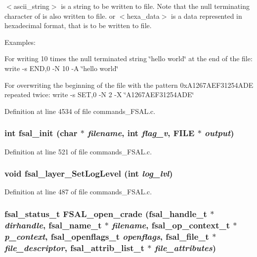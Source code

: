 $<$ascii\_\-string$>$ is a string to be written to file. Note that the null terminating character of is also written to file. or $<$hexa\_\-data$>$ is a data represented in hexadecimal format, that is to be written to file.

Examples:

For writing 10 times the null terminated string \char`\"{}hello world\char`\"{} at the end of the file: write -s END,0 -N 10 -A \char`\"{}hello world\char`\"{}

For overwriting the beginning of the file with the pattern 0xA1267AEF31254ADE repeated twice: write -s SET,0 -N 2 -X \char`\"{}A1267AEF31254ADE\char`\"{} 

Definition at line 4534 of file commands\_\-FSAL.c.
\subsubsection[{fsal\_\-init}]{\setlength{\rightskip}{0pt plus 5cm}int fsal\_\-init (char $\ast$ {\em filename}, \/  int {\em flag\_\-v}, \/  FILE $\ast$ {\em output})}\label{commands__FSAL_8c_edffedae46ff950a16883425cefd370d}




Definition at line 521 of file commands\_\-FSAL.c.
\subsubsection[{fsal\_\-layer\_\-SetLogLevel}]{\setlength{\rightskip}{0pt plus 5cm}void fsal\_\-layer\_\-SetLogLevel (int {\em log\_\-lvl})}\label{commands__FSAL_8c_8d06115f7aed032f29bab10e1bafc79e}




Definition at line 487 of file commands\_\-FSAL.c.
\subsubsection[{FSAL\_\-open\_\-crade}]{\setlength{\rightskip}{0pt plus 5cm}fsal\_\-status\_\-t FSAL\_\-open\_\-crade (fsal\_\-handle\_\-t $\ast$ {\em dirhandle}, \/  fsal\_\-name\_\-t $\ast$ {\em filename}, \/  fsal\_\-op\_\-context\_\-t $\ast$ {\em p\_\-context}, \/  fsal\_\-openflags\_\-t {\em openflags}, \/  fsal\_\-file\_\-t $\ast$ {\em file\_\-descriptor}, \/  fsal\_\-attrib\_\-list\_\-t $\ast$ {\em file\_\-attributes})}\label{commands__FSAL_8c_e438856e84f7d5ffc0383d63c7aa3064}


